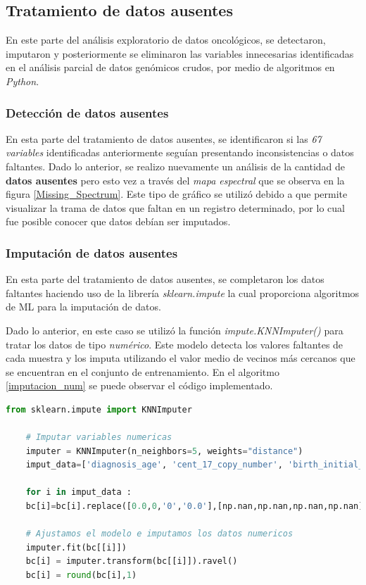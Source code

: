 \newpage
\subsection{Tratamiento de datos ausentes}
En este parte del análisis exploratorio de datos oncológicos, se detectaron, imputaron y posteriormente se eliminaron las variables innecesarias identificadas en el análisis parcial de datos genómicos crudos, por medio de algoritmos en \textit{Python}.

\subsubsection{Detección de datos ausentes}
En esta parte del tratamiento de datos ausentes, se identificaron si las \textit{67 variables} identificadas anteriormente seguían presentando inconsistencias o datos faltantes. Dado lo anterior, se realizo nuevamente un análisis de la cantidad de \textbf{datos ausentes} pero esto vez a través del \textit{mapa espectral} que se observa en la figura \ref{Missing_Spectrum}. Este tipo de gráfico se utilizó debido a que permite visualizar la trama de datos que faltan en un registro determinado, por lo cual fue posible conocer que datos debían ser imputados.

\subsubsection{Imputación de datos ausentes}
En esta parte del tratamiento de datos ausentes, se completaron los datos faltantes haciendo uso de la librería  \textit{sklearn.impute} la cual proporciona algoritmos de ML para la imputación de datos. 
 
Dado lo anterior, en este caso se utilizó la función \textit{impute.KNNImputer()} para tratar los datos de tipo \textit{numérico}. Este modelo detecta los valores faltantes de cada muestra y los imputa utilizando el valor medio de vecinos más cercanos que se encuentran en el conjunto de entrenamiento. En el algoritmo \ref{imputacion_num} se puede observar el código implementado.
 
 \begin{lstlisting}[basicstyle=\scriptsize,language=Python, label=imputacion_num, caption=Imputar datos numéricos con sklearn en Python.]
 	from sklearn.impute import KNNImputer
 	
 	# Imputar variables numericas
 	imputer = KNNImputer(n_neighbors=5, weights="distance")
	imput_data=['diagnosis_age', 'cent_17_copy_number', 'birth_initial_diagnosis', 'days_sample_collection', 'her_2_cent_17_ratio', 'disease_free_months', 'days_last_followup', 'year_initial_diagnosis', 'positive_lymph_hematoxylin', 'lymph_examined_number', 'mutation_count', 'overall_survival_months', 'tmb_nonsynonymous' ]
 	
 	for i in imput_data :
 	bc[i]=bc[i].replace([0.0,0,'0','0.0'],[np.nan,np.nan,np.nan,np.nan])
 	
 	# Ajustamos el modelo e imputamos los datos numericos
 	imputer.fit(bc[[i]])
 	bc[i] = imputer.transform(bc[[i]]).ravel()
 	bc[i] = round(bc[i],1)
 \end{lstlisting}
 
